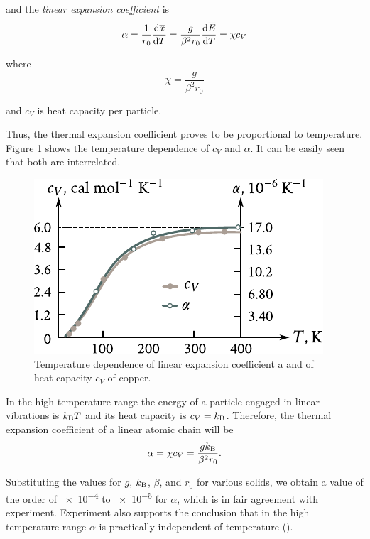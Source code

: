 \noindent
and the \textit{linear expansion coefficient} is
\begin{equation}\label{eq:4_48}
    \alpha = \frac{1}{r_0} \dfrac{\mathrm{d}\overline{x}}{\mathrm{d} T} = \frac{g}{\beta^2 r_0} \dfrac{\mathrm{d}\overline{E}}{\mathrm{d} T} = \chi c_V
\end{equation}

\noindent
where
\begin{equation}\label{eq:4_49}
    \chi = \frac{g}{\beta^2 r_0}
\end{equation}

\noindent
and $c_V$ is heat capacity per particle.

Thus, the thermal expansion coefficient proves to be proportional to temperature. Figure \ref{fig:4_8} shows the temperature dependence of $c_V$ and $\alpha$. It can be easily seen that both are interrelated.

\begin{figure}[t]
	\begin{center}
		\includegraphics[scale=1]{figures/ch_04/fig_4_8.pdf}
		\caption[]{Temperature dependence of linear expansion coefficient a and of heat capacity $c_V$ of copper.}
		\label{fig:4_8}
	\end{center}
	\vspace{-0.7cm}
\end{figure}

In the high temperature range the energy of a particle engaged in linear vibrations is $k_{\text{B}}T$ and its heat capacity is $c_V=k_{\text{B}}$. Therefore, the thermal expansion coefficient of a linear atomic chain will be
\begin{equation*}
    \alpha = \chi c_V = \frac{g k_{\text{B}}}{\beta^2 r_0}.
\end{equation*}

\noindent
Substituting the values for $g$, $k_{\text{B}}$, $\beta$, and $r_0$ for various solids, we obtain a value of the order of \num{e-4} to \num{e-5} for $\alpha$, which is in fair agreement with experiment. Experiment also supports the conclusion that in the high temperature range $\alpha$ is practically independent of temperature ().

